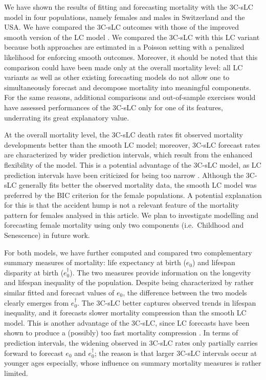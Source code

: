 \documentclass[Thesis]{subfiles}
\begin{document}
We have shown the results of fitting and forecasting mortality with the 3C-sLC model in four populations, namely females and males in Switzerland and the USA. We have compared the 3C-sLC outcomes with those of the improved smooth version of the LC model \citep{delwarde2007smoothing}. We compared the 3C-sLC with this LC variant because both approaches are estimated in a Poisson setting with a penalized likelihood for enforcing smooth outcomes. Moreover, it should be noted that this comparison could have been made only at the overall mortality level: all LC variants as well as other existing forecasting models do not allow one to simultaneously forecast and decompose mortality into meaningful components. For the same reasons, additional comparisons and out-of-sample exercises would have assessed performances of the 3C-sLC only for one of its features, underrating its great explanatory value.

At the overall mortality level, the 3C-sLC death rates fit observed mortality developments better than the smooth LC model; moreover, 3C-sLC forecast rates are characterized by wider prediction intervals, which result from the enhanced flexibility of the model. This is a potential advantage of the 3C-sLC model, as LC prediction intervals have been criticized for being too narrow \citep{alho1992comment}. Although the 3C-sLC generally fits better the observed mortality data, the smooth LC model was preferred by the BIC criterion for the female populations. A potential explanation for this is that the accident hump is not a relevant feature of the mortality pattern for females analysed in this article. We plan to investigate modelling and forecasting female mortality using only two  components (i.e.~Childhood and Senescence) in future work.

For both models, we have further computed and compared two complementary summary measures of mortality: life expectancy at birth ($e_0$) and lifespan disparity at birth ($e^{\dagger}_0$). The two measures provide information on the longevity and lifespan inequality  of the population. Despite being characterized by rather similar fitted and forecast values of $e_0$, the difference between the two models clearly emerges from $e^{\dagger}_0$. The 3C-sLC better captures observed trends in lifespan inequality, and it forecasts slower mortality compression than the smooth LC model. This is another advantage of the 3C-sLC, since LC forecasts have been shown to produce a (possibly) too fast mortality compression \cite[see, e.g.,][]{bardoutsos2018projecting,basellini2019modelling}. In terms of prediction intervals, the widening observed in 3C-sLC rates only partially carries forward to forecast $e_0$ and $e^{\dagger}_0$; the reason is that larger 3C-sLC intervals occur at younger ages especially, whose influence on summary mortality measures is rather limited. 
\end{document}
